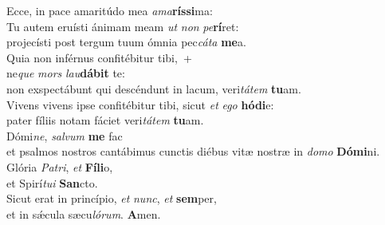 \oddverse Ecce, in pace amaritúdo mea \textit{a}\textit{ma}\textbf{rís}\textbf{si}ma:\\
\evenverse Tu autem eruísti ánimam meam \textit{ut} \textit{non} \textit{pe}\textbf{rí}ret:~\*\\
\evenverse projecísti post tergum tuum ómnia pec\textit{cá}\textit{ta} \textbf{me}a.\\
\oddverse Quia non inférnus confitébitur tibi,~+\\
\oddverse  ne\textit{que} \textit{mors} \textit{lau}\textbf{dá}\textbf{bit} te:~\*\\
\oddverse non exspectábunt qui descéndunt in lacum, veri\textit{tá}\textit{tem} \textbf{tu}am.\\
\evenverse Vivens vivens ipse confitébitur tibi, sicut \textit{et} \textit{e}\textit{go} \textbf{hó}\textbf{di}e:~\*\\
\evenverse pater fíliis notam fáciet veri\textit{tá}\textit{tem} \textbf{tu}am.\\
\oddverse Dómi\textit{ne}, \textit{sal}\textit{vum} \textbf{me} fac~\*\\
\oddverse et psalmos nostros cantábimus cunctis diébus vitæ nostræ in \textit{do}\textit{mo} \textbf{Dó}\textbf{mi}ni.\\
\evenverse Glória \textit{Pa}\textit{tri}, \textit{et} \textbf{Fí}\textbf{li}o,~\*\\
\evenverse et Spirí\textit{tu}\textit{i} \textbf{San}cto.\\
\oddverse Sicut erat in princípio, \textit{et} \textit{nunc}, \textit{et} \textbf{sem}per,~\*\\
\oddverse et in sǽcula sæcu\textit{ló}\textit{rum}. \textbf{A}men.\\
